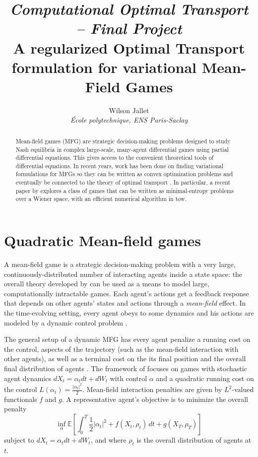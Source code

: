 \documentclass[11pt]{article}
\author{
	Wilson Jallet\\
	\textit{École polytechnique, ENS Paris-Saclay}
}
\title{
	{\Large\itshape Computational Optimal Transport -- Final Project}\\
	{\Large A regularized Optimal Transport formulation for variational Mean-Field Games}}
\newcommand{\EE}{\mathbb{E}}
\numberwithin{equation}{section}
\theoremstyle{definition}
\begin{document}
\maketitle


\begin{abstract}
	Mean-field games (MFG) are strategic decision-making problems designed to study Nash equilibria in complex large-scale, many-agent differential games using partial differential equations. This gives access to the convenient theoretical tools of differential equations. In recent years, work has been done on finding variational formulations for MFGs so they can be written as convex optimization problems and eventually be connected to the theory of optimal transport \cite{benamou:hal-01295299,benamou2015lagrangian}. In particular, a recent paper by \textcite{benamou2018entropy} explores a class of games that can be written as minimal-entropy problems over a Wiener space, with an efficient numerical algorithm in tow.
\end{abstract}



\section{Quadratic Mean-field games}

A mean-field game \cite{LASRY2006619,LASRY2006679} is a strategic decision-making problem with a very large, continuously-distributed number of interacting agents inside a state space: the overall theory developed by \citeauthor{LASRY2006619} can be used as a means to model large, computationally intractable games. Each agent's actions get a feedback response that depends on other agents' states and actions through a \textit{mean-field} effect. In the time-evolving setting, every agent obeys to some dynamics and his actions are modeled by a dynamic control problem \cite{LASRY2006679}.

The general setup of a dynamic MFG has every agent penalize a running cost on the control, aspects of the trajectory (such as the mean-field interaction with other agents), as well as a terminal cost on the its final position and the overall final distribution of agents \cite{LASRY2006679}.
The framework of \cites{benamou:hal-01295299}{benamou2018entropy} focuses on games with stochastic agent dynamics $dX_t = \alpha_tdt + dW_t$ with control $\alpha$ and a quadratic running cost on the control $L(\alpha_t) = \frac{|\alpha_t|^2}{2}$. Mean-field interaction penalties are given by $L^2$-valued functionals $f$ and $g$. A representative agent's objective is to minimize the overall penalty
\[
	\inf_{\alpha} \EE\left[
	\int_0^T \frac{1}{2}|\alpha_t|^2 + f(X_t, \rho_t) \,dt
	+ g(X_T, \rho_T)
	\right]
\]
subject to $dX_t = \alpha_tdt + dW_t$, and where $\rho_t$ is the overall distribution of agents at $t$.
\end{document}
